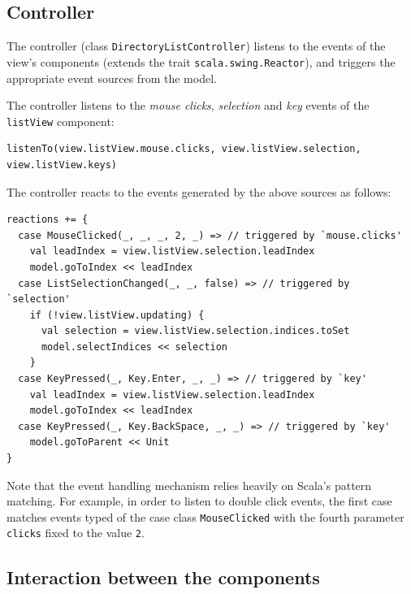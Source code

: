 \subsection{Controller}

The controller (class \texttt{DirectoryListController}) listens to the events of the view's components (extends the trait \texttt{scala.swing.Reactor}), and triggers the appropriate event sources from the model. 

The controller listens to the \emph{mouse clicks}, \emph{selection} and \emph{key} events of the \texttt{listView} component:
\begin{lstlisting}
listenTo(view.listView.mouse.clicks, view.listView.selection, view.listView.keys)
\end{lstlisting}


The controller reacts to the events generated by the above sources as follows:
\begin{lstlisting}
reactions += {
  case MouseClicked(_, _, _, 2, _) => // triggered by `mouse.clicks'
    val leadIndex = view.listView.selection.leadIndex
    model.goToIndex << leadIndex
  case ListSelectionChanged(_, _, false) => // triggered by `selection'
    if (!view.listView.updating) {
      val selection = view.listView.selection.indices.toSet
      model.selectIndices << selection
    }
  case KeyPressed(_, Key.Enter, _, _) => // triggered by `key'
    val leadIndex = view.listView.selection.leadIndex
    model.goToIndex << leadIndex
  case KeyPressed(_, Key.BackSpace, _, _) => // triggered by `key'
    model.goToParent << Unit
}
\end{lstlisting}

Note that the event handling mechanism relies heavily on Scala's pattern matching. For example, in order to listen to double click events, the first case matches events typed of the case class \texttt{MouseClicked} with the fourth parameter \texttt{clicks} fixed to the value \texttt{2}. 

\subsection{Interaction between the components}

